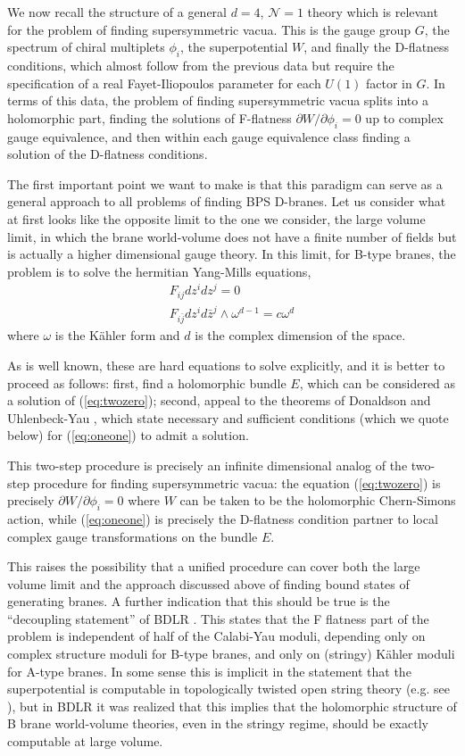 \documentclass[a4paper,12pt]{amsart}
\numberwithin{equation}{section}
\theoremstyle{plain}
\theoremstyle{definition}
\def\cal{\mathcal}
\def\p{\partial}
\def\CN{{\cal N}}
\begin{document}
We now recall the structure of a general $d=4$, $\CN=1$ theory which
is relevant for the problem of finding supersymmetric vacua.  This is
the gauge group $G$, the spectrum of chiral multiplets $\phi_i$, the
superpotential $W$, and finally the D-flatness conditions, which
almost follow from the previous data but require the specification of
a real Fayet-Iliopoulos parameter for each $U(1)$ factor in $G$.  In
terms of this data, the problem of finding supersymmetric vacua splits
into a holomorphic part, finding the solutions of F-flatness $\p W/\p
\phi_i=0$ up to complex gauge equivalence, and then within each gauge
equivalence class finding a solution of the D-flatness conditions.

The first important point we want to make is that this paradigm
can serve as a general approach to
all problems of finding BPS D-branes.  Let us consider what at first
looks like the opposite limit to the one we consider, the large volume
limit, in which the brane world-volume does not have a finite number
of fields but is actually a higher dimensional gauge theory.  In this
limit, for B-type branes,
the problem is to solve the hermitian Yang-Mills equations,
\begin{eqnarray}
F_{ij} dz^i dz^j = 0 \label{eq:twozero} \\
F_{i\bar j} dz^i d\bar z^j \wedge \omega^{d-1} = c \omega^d
\label{eq:oneone}
\end{eqnarray}
where $\omega$ is the K\"ahler form and $d$ is the complex dimension
of the space.

As is well known, these are hard equations to solve explicitly, and it
is better to proceed as follows: first, find a holomorphic bundle $E$,
which can be considered as a solution of (\ref{eq:twozero}); second,
appeal to the theorems of Donaldson and Uhlenbeck-Yau \cite{DK}, which state
necessary and sufficient conditions (which we quote below) for
(\ref{eq:oneone}) to admit a solution.

This two-step procedure is precisely an infinite dimensional analog of
the two-step procedure for finding supersymmetric vacua: the equation
(\ref{eq:twozero}) is precisely $\p W/\p \phi_i=0$ where $W$ can be
taken to be the holomorphic Chern-Simons action, while
(\ref{eq:oneone}) is precisely the D-flatness condition partner to
local complex gauge transformations on the bundle $E$.

This raises the possibility that a unified procedure can cover both
the large volume limit and the approach discussed above of finding
bound states of generating branes.  A further indication that this
should be true is the ``decoupling statement'' of BDLR \cite{BDLR}.
This states that the F flatness part of the problem is independent of
half of the Calabi-Yau moduli, depending only on complex structure
moduli for B-type branes, and only on (stringy) K\"ahler moduli for
A-type branes.  In some sense this is implicit in the statement that
the superpotential is computable in topologically twisted open string
theory (e.g. see \cite{Witten-top,BCOV}), but in BDLR it was realized
that this implies that the holomorphic structure of B brane
world-volume theories, even in the stringy regime, should be exactly
computable at large volume.
\end{document}
